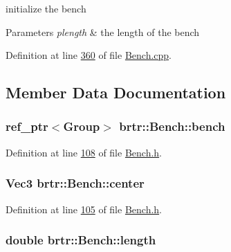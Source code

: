 initialize the bench 


\begin{DoxyParams}{Parameters}
{\em plength} & the length of the bench \\
\hline
\end{DoxyParams}


Definition at line \hyperlink{_bench_8cpp_source_l00360}{360} of file \hyperlink{_bench_8cpp_source}{Bench.\+cpp}.



\subsection{Member Data Documentation}
\hypertarget{classbrtr_1_1_bench_aa3da8798872d1c2d595c24a48a5cb427}{
\subsubsection[{bench}]{\setlength{\rightskip}{0pt plus 5cm}ref\+\_\+ptr$<$Group$>$ brtr\+::\+Bench\+::bench\hspace{0.3cm}{\ttfamily [private]}}}\label{classbrtr_1_1_bench_aa3da8798872d1c2d595c24a48a5cb427}


Definition at line \hyperlink{_bench_8h_source_l00108}{108} of file \hyperlink{_bench_8h_source}{Bench.\+h}.

\hypertarget{classbrtr_1_1_bench_a5ea108ad6ee96d487ac00ecacc383aa2}{
\subsubsection[{center}]{\setlength{\rightskip}{0pt plus 5cm}Vec3 brtr\+::\+Bench\+::center\hspace{0.3cm}{\ttfamily [private]}}}\label{classbrtr_1_1_bench_a5ea108ad6ee96d487ac00ecacc383aa2}


Definition at line \hyperlink{_bench_8h_source_l00105}{105} of file \hyperlink{_bench_8h_source}{Bench.\+h}.

\hypertarget{classbrtr_1_1_bench_a81188a60871201d741c288396430964d}{
\subsubsection[{length}]{\setlength{\rightskip}{0pt plus 5cm}double brtr\+::\+Bench\+::length\hspace{0.3cm}{\ttfamily [private]}}}\label{classbrtr_1_1_bench_a81188a60871201d741c288396430964d}


